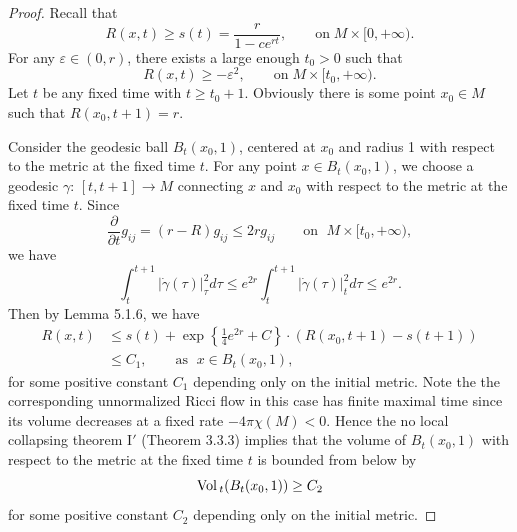 \begin{proof}
Recall that
$$
R(x,t)\ge s(t) =\frac{r}{1-ce^{rt}},\qquad \text{on}\; M\times
[0,+\infty).
$$
For any $\varepsilon\in(0,r)$, there exists a large enough $t_0>0$
such that \begin{equation} R(x,t)\ge-\varepsilon^2,\qquad \text{on}\;
M\times[t_0,+\infty).
\end{equation} Let $t$ be any fixed time with $t\ge t_0+1$. Obviously there
is some point $x_0\in M$ such that $R(x_0,t+1)=r$.

Consider the geodesic ball $B_t(x_0,1)$, centered at $x_0$ and
radius 1 with respect to the metric at the fixed time $t$. For any
point $x\in B_t(x_0,1)$, we choose a geodesic $\gamma$:
$[t,t+1]\rightarrow M$ connecting $x$ and $x_0$ with respect to
the metric at the fixed time $t$. Since
$$
\frac{\partial }{\partial t}g_{ij}=(r-R)g_{ij} \le 2rg_{ij}\qquad
\text{on }\;M\times[t_0,+\infty),
$$
we have
$$
\int_t^{t+1}|\dot{\gamma}(\tau)|^2_\tau d\tau\le
e^{2r}\int_t^{t+1} |\dot{\gamma}(\tau)|^2_t d\tau\leq e^{2r}.
$$
Then by Lemma 5.1.6, we have
\begin{align}
R(x,t)& \leq s(t)+\exp\left\{\frac{1}{4}e^{2r}+C\right\}
\cdot(R(x_0,t+1)-s(t+1))\\
& \leq C_1,\qquad \text{as }\; x\in B_t(x_0,1),\nonumber
\end{align} %
for some positive constant $C_1$ depending only on the initial
metric. Note the the corresponding unnormalized Ricci flow in this
case has finite maximal time since its volume decreases at a fixed
rate $-4\pi \chi (M) < 0$. Hence the no local collapsing theorem
I$'$ (Theorem 3.3.3) implies that the volume of $B_t(x_0,1)$ with
respect to the metric at the fixed time $t$ is bounded from below
by \begin{equation}
\Vol_t(B_t(x_0,1))\geq C_2 %
\end{equation} for some positive constant $C_2$ depending only on the initial
metric.


\end{proof}
